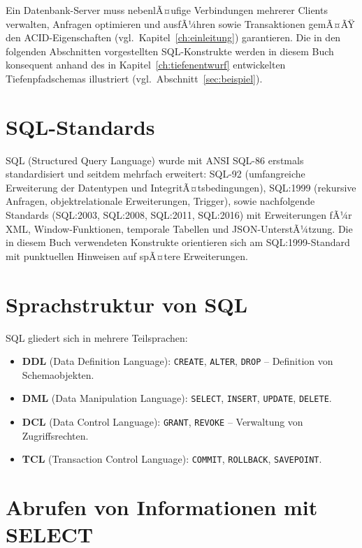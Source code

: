 ﻿\documentclass[a4paper,12pt]{report}
\theoremstyle{definition}
\theoremstyle{remark}
\begin{document}
Ein Datenbank-Server muss nebenlÃ¤ufige Verbindungen mehrerer Clients
verwalten, Anfragen optimieren und ausfÃ¼hren sowie Transaktionen gemÃ¤ÃŸ
den ACID-Eigenschaften (vgl.\ Kapitel~\ref{ch:einleitung}) garantieren.
Die in den folgenden Abschnitten vorgestellten SQL-Konstrukte werden in
diesem Buch konsequent anhand des in Kapitel~\ref{ch:tiefenentwurf}
entwickelten Tiefenpfadschemas illustriert (vgl.\
Abschnitt~\ref{sec:beispiel}).

\section{SQL-Standards}
\label{sec:sql-standards}

SQL (Structured Query Language) wurde mit ANSI SQL-86 erstmals
standardisiert und seitdem mehrfach erweitert: SQL-92 (umfangreiche
Erweiterung der Datentypen und IntegritÃ¤tsbedingungen), SQL:1999
(rekursive Anfragen, objektrelationale Erweiterungen, Trigger), sowie
nachfolgende Standards (SQL:2003, SQL:2008, SQL:2011, SQL:2016) mit
Erweiterungen fÃ¼r XML, Window-Funktionen, temporale Tabellen und
JSON-UnterstÃ¼tzung. Die in diesem Buch verwendeten Konstrukte
orientieren sich am SQL:1999-Standard mit punktuellen Hinweisen auf
spÃ¤tere Erweiterungen.

\section{Sprachstruktur von SQL}

SQL gliedert sich in mehrere Teilsprachen:

\begin{itemize}
  \item \textbf{DDL} (Data Definition Language): \texttt{CREATE},
    \texttt{ALTER}, \texttt{DROP} -- Definition von Schemaobjekten.
  \item \textbf{DML} (Data Manipulation Language): \texttt{SELECT},
    \texttt{INSERT}, \texttt{UPDATE}, \texttt{DELETE}.
  \item \textbf{DCL} (Data Control Language): \texttt{GRANT},
    \texttt{REVOKE} -- Verwaltung von Zugriffsrechten.
  \item \textbf{TCL} (Transaction Control Language): \texttt{COMMIT},
    \texttt{ROLLBACK}, \texttt{SAVEPOINT}.
\end{itemize}

\section{Abrufen von Informationen mit SELECT}
\label{sec:select}
\end{document}
